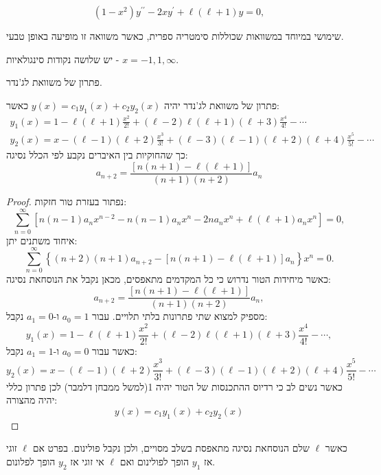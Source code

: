 \documentclass{tstextbook}
\begin{document}
\begin{definition}
$$(1-x^{2})y^{\prime\prime}-2x y^{\prime}+\ell(\ell+1)y=0,$$

\end{definition}
\begin{remark}
שימושי במיוחד במשוואות שכוללות סימטריה ספרית, כאשר משוואה זו מופיעה באופן טבעי.

\end{remark}
\begin{proposition}
יש שלושה נקודות סינגולאיות - \(x=-1,1,\infty\). 

\end{proposition}
\begin{definition}
פתרון של משוואת לג'נדר.

\end{definition}
\begin{proposition}
פתרון של משוואת לג'נדר יהיה \(y(x)=c_{1}y_{1}(x)+c_{2}y_{2}(x)\) כאשר:
$$\begin{gather}y_{1}(x)=1-\ell(\ell+1)\frac{x^{2}}{2!}+(\ell-2)\ell(\ell+1)(\ell+3)\frac{x^{4}}{4!}-\cdots \\y_{2}(x)=x-(\ell-1)(\ell+2)\frac{x^{3}}{3!}+(\ell-3)(\ell-1)(\ell+2)(\ell+4)\frac{x^{5}}{5!}-\cdots
\end{gather}$$
כך שהחוקיות בין האיברים נקבע לפי הכלל נסיגה:
$$a_{n+2}=\frac{[n(n+1)-\ell(\ell+1)]}{(n+1)(n+2)}a_{n}$$

\end{proposition}
\begin{proof}
נפתור בעזרת טור חזקות:
$$\sum_{n=0}^{\infty}\left[n(n-1)a_{n}x^{n-2}-n(n-1)a_{n}x^{n}-2n a_{n}x^{n}+\ell(\ell+1)a_{n}x^{n}\right]=0,$$
איחוד משתנים יתן:
$$\sum_{n=0}^{\infty}\left\{(n+2)(n+1)a_{n+2}-[n(n+1)-\ell(\ell+1)]a_{n}\right\}x^{n}=0.$$
כאשר מיחידות הטור נדרוש כי כל המקדמים מתאפסים, מכאן נקבל את הנוסחאת נסיגה:
$$a_{n+2}=\frac{[n(n+1)-\ell(\ell+1)]}{(n+1)(n+2)}a_{n},$$
מספיק למצוא שתי פתרונות בלתי תלויים. עבור \(a_{0}=1\) ו-\(a_{1}=0\) נקבל:
$$y_{1}(x)=1-\ell(\ell+1)\frac{x^{2}}{2!}+(\ell-2)\ell(\ell+1)(\ell+3)\frac{x^{4}}{4!}-\cdots,$$
כאשר עבור \(a_{0}=0\) ו-\(a_{1}=1\) נקבל:
$$y_{2}(x)=x-(\ell-1)(\ell+2)\frac{x^{3}}{3!}+(\ell-3)(\ell-1)(\ell+2)(\ell+4)\frac{x^{5}}{5!}-\cdots$$
כאשר נשים לב כי רדיוס ההתכנסות של הטור יהיה 1(למשל ממבחן דלמבר)
לכן פתרון כללי יהיה מהצורה:
$$y(x)=c_{1}y_{1}(x)+c_{2}y_{2}(x)$$

\end{proof}
\begin{proposition}
כאשר \(\ell\) שלם הנוסחאת נסיגה מתאפסת בשלב מסויים, ולכן נקבל פולינום. בפרט אם \(\ell\) זוגי אז \(y_{1}\) הופך לפולינום ואם \(\ell\) אי זוגי אז \(y_{2}\) הופך לפלונום. 

\end{proposition}
\end{document}
